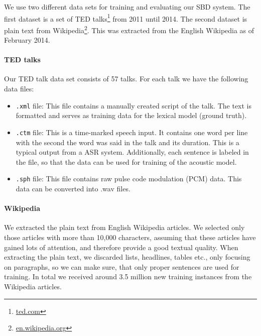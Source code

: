 
We use two different data sets for training and evaluating our SBD system.
The first dataset is a set of TED talks\footnote{\url{ted.com}} from 2011 until 2014.
The second dataset is plain text from Wikipedia\footnote{\url{en.wikipedia.org}}.
This was extracted from the English Wikipedia as of February 2014.

\paragraph{TED talks}
Our TED talk data set consists of 57 talks. For each talk we have the following data files:
\begin{itemize}
	\item \texttt{.xml} file: This file contains a manually created script of the talk.
	The text is formatted and serves as training data for the lexical model (ground truth).
	\item \texttt{.ctm} file: This is a time-marked speech input.
	It contains one word per line with the second the word was said in the talk and its duration.
    This is a typical output from a ASR system.
	Additionally, each sentence is labeled in the file, so that the data can be used for training of the acoustic model.
	\item \texttt{.sph} file: This file contains raw pulse code modulation (PCM) data.
	This data can be converted into .wav files.
\end{itemize}

\paragraph{Wikipedia}
We extracted the plain text from English Wikipedia articles.
We selected only those articles with more than 10,000 characters, assuming that these articles have gained lots of attention, and therefore provide a good textual quality.
When extracting the plain text, we discarded lists, headlines, tables etc., only focusing on paragraphs, so we can make sure, that only proper sentences are used for training.
In total we received around 3.5 million new training instances from the Wikipedia articles.
